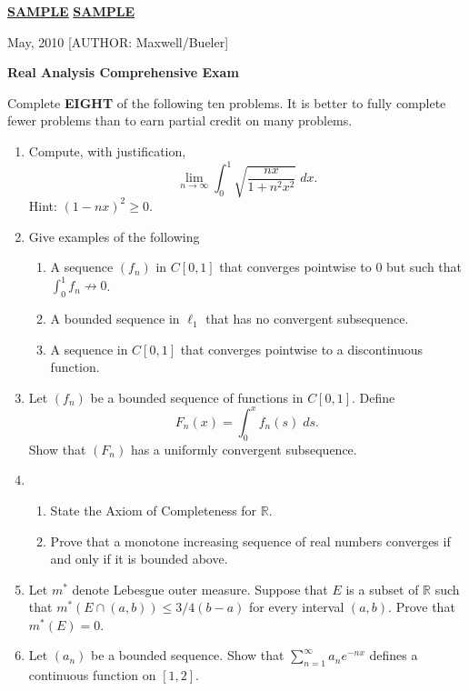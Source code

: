 \documentclass[12pt]{article}
\def\ra{\rightarrow}
\def\Reals{{\mathbb R}}
\begin{document}
\thispagestyle{empty}
\Large \noindent \underline{\textbf{SAMPLE}} \hfill\underline{\textbf{SAMPLE}}

\scriptsize {} May, 2010  \hfill  \tiny [AUTHOR: Maxwell/Bueler]
\normalsize\bigskip

\centerline{\large\textbf{Real Analysis Comprehensive Exam}} 
\bigskip

Complete {\bf EIGHT} of the following ten problems.  It is better to fully
complete fewer problems than to earn partial credit on many problems.
\bigskip
\begin{enumerate}

\item Compute, with justification, 
$$
\lim_{n\ra\infty} \int_0^1 \sqrt{\frac{nx}{1+n^2x^2}}\; dx.
$$
Hint:  $(1-nx)^2 \ge 0$.

\item Give examples of the following
\begin{enumerate}
	\item A sequence $(f_n)$ in $C[0,1]$ that converges pointwise to $0$
	 but such that $\int_0^1 f_n\not\ra 0$.  
	\item A bounded sequence in $\ell_1$ that has no convergent subsequence.
	\item A sequence in $C[0,1]$ that converges pointwise to a discontinuous function.
\end{enumerate}	

\item Let $(f_n)$ be a bounded sequence of functions in $C[0,1]$.
Define
$$
F_n(x) = \int_0^x f_n(s)\; ds.
$$
Show that $(F_n)$ has a uniformly convergent subsequence.

\item 
\begin{enumerate}
	\item State the Axiom of Completeness for $\Reals$.
	\item Prove that a monotone increasing sequence of real numbers converges if and only
	if it is bounded above.
\end{enumerate}

\item Let $m^*$ denote Lebesgue outer measure.  Suppose that $E$ is a subset of $\Reals$
such that $m^*(E\cap (a,b)) \le 3/4 (b-a)$ for every interval $(a,b)$. Prove that
$m^*(E)=0$.

\item Let $(a_n)$ be a bounded sequence.  Show that $\sum_{n=1}^\infty a_n e^{-nx}$
defines a continuous function on $[1,2]$.


\end{enumerate}
\end{document}
